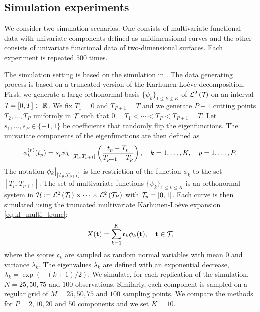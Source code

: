 \subsection{Simulation experiments} %
\label{sub:simulation_experiments}

We consider two simulation scenarios. One consists of multivariate functional data with univariate components defined as unidimensional curves and the other consists of univariate functional data of two-dimensional surfaces. Each experiment is repeated $500$ times.

\begin{scenario}
The simulation setting is based on the simulation in \cite{happMultivariateFunctionalPrincipal2015}. The data generating process is based on a truncated version of the Karhunen-Loève decomposition. First, we generate a large orthonormal basis $\{\psi_k\}_{1 \leq k \leq K}$ of $\mathcal{L}^{2}\left(\mathcal{T}_{}\right)$ on an interval $\mathcal{T}_{} = [0, T] \subset \mathbb{R}$. We fix $T_1 = 0$ and $T_{P + 1} = T$ and we generate $P - 1$ cutting points $T_2, \dots, T_P$ uniformly in $\mathcal{T}_{}$ such that $0 = T_1 < \cdots < T_P < T_{P+1} = T$. Let $s_1, \dots, s_P \in \{-1, 1\}$ be coefficients that randomly flip the eigenfunctions. The univariate components of the eigenfunctions are then defined as
\begin{equation}\label{eq:simulation_uni_component}
    \phi_k^{(p)}(t_p) = s_p \restr{\psi_k}{[T_p, T_{p + 1}]}\left(\frac{t_p - T_p}{T_{p + 1} - T_p}\right), \quad k = 1, \dots, K, \quad p = 1, \dots, P.
\end{equation}
The notation $\restr{\phi_k}{[T_p, T_{p + 1}]}$ is the restriction of the function $\phi_k$ to the set $[T_p, T_{p + 1}]$. The set of multivariate functions $\{\psi_k\}_{1 \leq k \leq K}$ is an orthonormal system in $\mathcal{H} \coloneqq \mathcal{L}^{2}\left(\mathcal{T}_{1}\right) \times \dots \times \mathcal{L}^{2}\left(\mathcal{T}_{P}\right)$ with $\mathcal{T}_{p} = [0, 1]$. Each curve is then simulated using the truncated multivariate Karhunen-Loève expansion \eqref{eq:kl_multi_trunc}:
\begin{equation}
    X(\mathbf{t}) = \sum_{k = 1}^K \mathfrak{c}_k \phi_k(\mathbf{t}), \quad \mathbf{t} \in \mathcal{T}_{},
\end{equation}
where the scores $\mathfrak{c}_k$ are sampled as random normal variables with mean $0$ and variance $\lambda_k$. The eigenvalues $\lambda_k$ are defined with an exponential decrease, $\lambda_k = \exp(-(k + 1)/2)$. We simulate, for each replication of the simulation, $N = 25, 50, 75$ and $100$ observations. Similarly, each component is sampled on a regular grid of $M = 25, 50, 75$ and $100$ sampling points. We compare the methods for $P = 2, 10, 20$ and $50$ components and we set $K = 10$.
\end{scenario}

